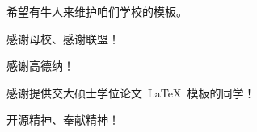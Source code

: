 
\begin{thanks}

  {\color{red} 希望有牛人来维护咱们学校的模板。}

  感谢母校、感谢联盟！

  感谢高德纳！

  感谢提供交大硕士学位论文~\LaTeX~模板的同学！

  开源精神、奉献精神！

  \vskip 20mm
 {
%
%
  }
\end{thanks}
